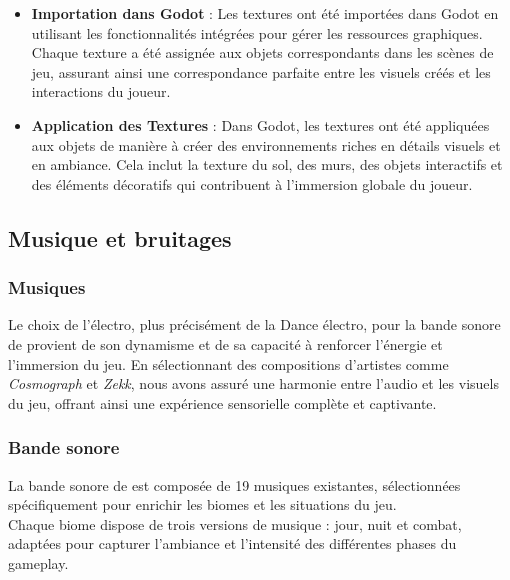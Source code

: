 \begin{itemize}
    \item \textbf{Importation dans Godot} : Les textures ont été importées dans Godot en utilisant les fonctionnalités intégrées pour gérer les ressources graphiques. Chaque texture a été assignée aux objets correspondants dans les scènes de jeu, assurant ainsi une correspondance parfaite entre les visuels créés et les interactions du joueur.
    \\

    \item \textbf{Application des Textures} : Dans Godot, les textures ont été appliquées aux objets de manière à créer des environnements riches en détails visuels et en ambiance. Cela inclut la texture du sol, des murs, des objets interactifs et des éléments décoratifs qui contribuent à l'immersion globale du joueur.
\end{itemize}








\subsection{Musique et bruitages}

\subsubsection{Musiques}

Le choix de l'électro, plus précisément de la Dance électro, pour la bande sonore de \gameName provient de son dynamisme et de sa capacité à renforcer l'énergie et l'immersion du jeu.
En sélectionnant des compositions d'artistes comme \textit{Cosmograph} et \textit{Zekk}, nous avons assuré une harmonie entre l'audio et les visuels du jeu, offrant ainsi une expérience sensorielle complète et captivante.

\subsubsection{Bande sonore}

La bande sonore de \gameName est composée de 19 musiques existantes, sélectionnées spécifiquement pour enrichir les biomes et les situations du jeu.
\\

Chaque biome dispose de trois versions de musique : jour, nuit et combat, adaptées pour capturer l'ambiance et l'intensité des différentes phases du gameplay.
\\

